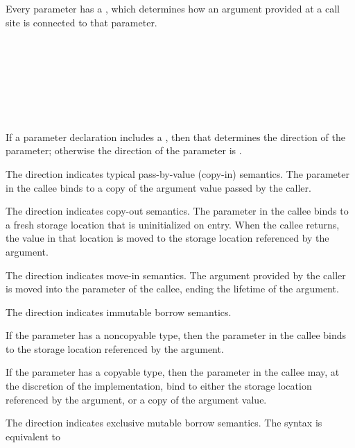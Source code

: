 Every parameter has a , which determines how an argument provided at a call site is connected to that parameter.

\begin{Syntax}
     \\
         \\
        \SynOr {} \\
        \SynOr {} \\
        \SynOr {} \\
        \SynOr {} \SynOr {}
        \SynOr {} \\
\end{Syntax}

If a parameter declaration includes a , then that determines the direction of the parameter; otherwise the direction of the parameter is .


The  direction indicates typical pass-by-value (copy-in) semantics.
The parameter in the callee binds to a copy of the argument value passed by the caller.


The  direction indicates copy-out semantics.
The parameter in the callee binds to a fresh storage location that is uninitialized on entry.
When the callee returns, the value in that location is moved to the storage location referenced by the argument.


The  direction indicates move-in semantics.
The argument provided by the caller is moved into the parameter of the callee, ending the lifetime of the argument.


The  direction indicates immutable borrow semantics.

If the parameter has a noncopyable type, then the parameter in the callee binds to the storage location referenced by the argument.

If the parameter has a copyable type, then the parameter in the callee may, at the discretion of the implementation, bind to either the storage location referenced by the argument, or a copy of the argument value.


The  direction indicates exclusive mutable borrow semantics.
The syntax  is equivalent to 

